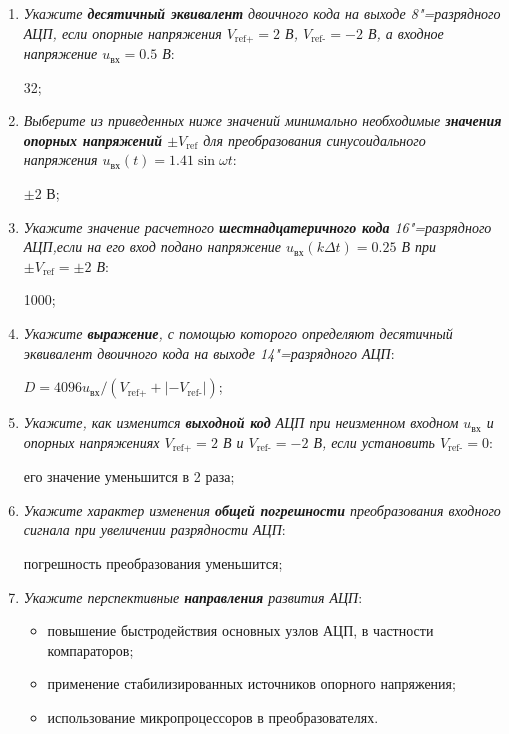 \documentclass[spec, och, labwork]{shiza}
\begin{document}
\begin{enumerate}
    \item
        \textit{Укажите \textbf{десятичный эквивалент} двоичного кода на выходе
        8"=разрядного АЦП, если опорные напряжения $V_\text{ref+} = 2$ В,
        $V_\text{ref-} = -2$ В, а входное напряжение $u_\text{вх} = 0.5$ В}:

        32;

    \item
        \textit{Выберите из приведенных ниже значений минимально необходимые
        \textbf{значения опорных напряжений} $\pm V_\text{ref}$ для
        преобразования синусоидального напряжения $u_\text{вх}(t) = 1.41 \sin
        \omega t$}:
    
        $\pm 2$ В;

    \item
        \textit{Укажите значение расчетного \textbf{шестнадцатеричного кода}
        16"=разрядного АЦП,если на его вход подано напряжение $u_\text{вх}(k
        \Delta t) = 0.25$ В при $\pm V_\text{ref} = \pm 2$ В}:
    
        1000;

    \item
        \textit{Укажите \textbf{выражение}, с помощью которого определяют
        десятичный эквивалент двоичного кода на выходе 14"=разрядного АЦП}:

        $D = 4096 u_\text{вх} / (V_\text{ref+} + |-V_\text{ref-}|)$;
    
    \item
        \textit{Укажите, как изменится \textbf{выходной код} АЦП при неизменном
        входном $u_\text{вх}$ и опорных напряжениях $V_\text{ref+} = 2$ В и
        $V_\text{ref-} = -2$ В, если установить $V_\text{ref-} = 0$}:
    
        его значение уменьшится в 2 раза;

    \item
        \textit{Укажите характер изменения \textbf{общей погрешности}
        преобразования входного сигнала при увеличении разрядности АЦП}:
    
        погрешность преобразования уменьшится;

    \item
        \textit{Укажите перспективные \textbf{направления} развития АЦП}:
    
        \begin{itemize}
            \item повышение быстродействия основных узлов АЦП, в частности компараторов;
            \item применение стабилизированных источников опорного напряжения;
            \item использование микропроцессоров в преобразователях.
        \end{itemize}


\end{enumerate}
\end{document}
